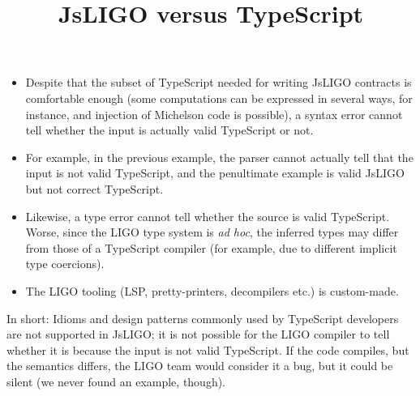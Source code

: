 \documentclass[wide]{slides}
\newcommand{\JsLIGO}[0]{\textsf{JsLIGO}}
\newcommand{\TypeScript}[0]{\textsf{TypeScript}}
\newcommand{\Michelson}[0]{\textsf{Michelson}}
\begin{document}
\begin{slide}
  \title{JsLIGO versus TypeScript}

  \begin{itemize}

    \item Despite that the subset of \TypeScript{} needed for writing
      \JsLIGO{} contracts is comfortable enough (some computations can
      be expressed in several ways, for instance, and injection of
      \Michelson{} code is possible), a syntax error cannot tell
      whether the input is actually valid \TypeScript{} or not.

    \item For example, in the previous example, the parser cannot
      actually tell that the input is not valid \TypeScript{}, and the
      penultimate example is valid \JsLIGO{} but not correct
      \TypeScript{}.

    \item Likewise, a type error cannot tell whether the source is
      valid \TypeScript{}. Worse, since the LIGO type system is
      \emph{ad hoc}, the inferred types may differ from those of a
      \TypeScript{} compiler (for example, due to different implicit
      type coercions).

    \item The LIGO tooling (LSP, pretty\hyp{}printers, decompilers
      etc.) is custom\hyp{}made.

  \end{itemize}
In short: Idioms and design patterns commonly used by \TypeScript{}
developers are not supported in \JsLIGO{}; it is not possible for the
LIGO compiler to tell whether it is because the input is not valid
\TypeScript{}. If the code compiles, but the semantics differs, the
LIGO team would consider it a bug, but it could be silent (we never
found an example, though).

\end{slide}
\end{document}
